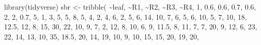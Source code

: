 \documentclass[
  letterpaper,
  DIV=11,
  numbers=noendperiod]{scrreprt}
\newenvironment{Shaded}{\begin{snugshade}}{\end{snugshade}}
\newcommand{\DecValTok}[1]{\textcolor[rgb]{0.68,0.00,0.00}{#1}}
\newcommand{\FloatTok}[1]{\textcolor[rgb]{0.68,0.00,0.00}{#1}}
\newcommand{\FunctionTok}[1]{\textcolor[rgb]{0.28,0.35,0.67}{#1}}
\newcommand{\NormalTok}[1]{\textcolor[rgb]{0.00,0.23,0.31}{#1}}
\newcommand{\OtherTok}[1]{\textcolor[rgb]{0.00,0.23,0.31}{#1}}
\newcommand{\SpecialCharTok}[1]{\textcolor[rgb]{0.37,0.37,0.37}{#1}}
\begin{document}
\begin{Shaded}
\begin{Highlighting}[]
\FunctionTok{library}\NormalTok{(tidyverse)}
\NormalTok{sbr }\OtherTok{\textless{}{-}} \FunctionTok{tribble}\NormalTok{(}
\SpecialCharTok{\textasciitilde{}}\NormalTok{leaf, }\SpecialCharTok{\textasciitilde{}}\NormalTok{R1, }\SpecialCharTok{\textasciitilde{}}\NormalTok{R2,  }\SpecialCharTok{\textasciitilde{}}\NormalTok{R3, }\SpecialCharTok{\textasciitilde{}}\NormalTok{R4,}
\DecValTok{1}\NormalTok{, }\FloatTok{0.6}\NormalTok{, }\FloatTok{0.6}\NormalTok{,  }\FloatTok{0.7}\NormalTok{, }\FloatTok{0.6}\NormalTok{,}
\DecValTok{2}\NormalTok{,   }\DecValTok{2}\NormalTok{, }\FloatTok{0.7}\NormalTok{,    }\DecValTok{5}\NormalTok{,   }\DecValTok{1}\NormalTok{,}
\DecValTok{3}\NormalTok{,   }\DecValTok{5}\NormalTok{,   }\DecValTok{5}\NormalTok{,    }\DecValTok{8}\NormalTok{,   }\DecValTok{5}\NormalTok{,}
\DecValTok{4}\NormalTok{,   }\DecValTok{2}\NormalTok{,   }\DecValTok{4}\NormalTok{,    }\DecValTok{6}\NormalTok{,   }\DecValTok{2}\NormalTok{,}
\DecValTok{5}\NormalTok{,   }\DecValTok{6}\NormalTok{,  }\DecValTok{14}\NormalTok{,   }\DecValTok{10}\NormalTok{,   }\DecValTok{7}\NormalTok{,}
\DecValTok{6}\NormalTok{,   }\DecValTok{5}\NormalTok{,   }\DecValTok{6}\NormalTok{,   }\DecValTok{10}\NormalTok{,   }\DecValTok{5}\NormalTok{,}
\DecValTok{7}\NormalTok{,  }\DecValTok{10}\NormalTok{,  }\DecValTok{18}\NormalTok{, }\FloatTok{12.5}\NormalTok{,  }\DecValTok{12}\NormalTok{,}
\DecValTok{8}\NormalTok{,  }\DecValTok{15}\NormalTok{,  }\DecValTok{30}\NormalTok{,   }\DecValTok{22}\NormalTok{,  }\DecValTok{10}\NormalTok{,}
\DecValTok{9}\NormalTok{,   }\DecValTok{7}\NormalTok{,   }\DecValTok{2}\NormalTok{,   }\DecValTok{12}\NormalTok{,   }\DecValTok{8}\NormalTok{,}
\DecValTok{10}\NormalTok{,  }\DecValTok{6}\NormalTok{,   }\DecValTok{9}\NormalTok{, }\FloatTok{11.5}\NormalTok{,   }\DecValTok{8}\NormalTok{,}
\DecValTok{11}\NormalTok{,  }\DecValTok{7}\NormalTok{,   }\DecValTok{7}\NormalTok{,   }\DecValTok{20}\NormalTok{,   }\DecValTok{9}\NormalTok{,}
\DecValTok{12}\NormalTok{,  }\DecValTok{6}\NormalTok{,  }\DecValTok{23}\NormalTok{,   }\DecValTok{22}\NormalTok{,  }\DecValTok{14}\NormalTok{,}
\DecValTok{13}\NormalTok{, }\DecValTok{10}\NormalTok{,  }\DecValTok{35}\NormalTok{, }\FloatTok{18.5}\NormalTok{,  }\DecValTok{20}\NormalTok{,}
\DecValTok{14}\NormalTok{, }\DecValTok{19}\NormalTok{,  }\DecValTok{10}\NormalTok{,    }\DecValTok{9}\NormalTok{,  }\DecValTok{10}\NormalTok{,}
\DecValTok{15}\NormalTok{, }\DecValTok{15}\NormalTok{,  }\DecValTok{20}\NormalTok{,   }\DecValTok{19}\NormalTok{,  }\DecValTok{20}\NormalTok{,}

\end{Highlighting}
\end{Shaded}
\end{document}
